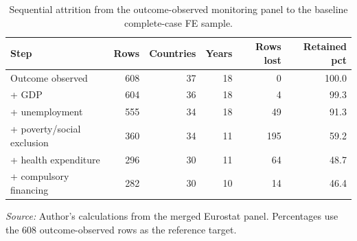 \begin{table}[H]
\centering
\small
\caption{Sequential attrition from the outcome-observed monitoring panel to the baseline complete-case FE sample.}
\label{tab:complete_case_attrition_waterfall}
\begin{tabular}{@{}lrrrrr@{}}
\toprule
Step & Rows & Countries & Years & Rows lost & Retained pct \\
\midrule
Outcome observed & 608 & 37 & 18 & 0 & 100.0 \\
+ GDP & 604 & 36 & 18 & 4 & 99.3 \\
+ unemployment & 555 & 34 & 18 & 49 & 91.3 \\
+ poverty/social exclusion & 360 & 34 & 11 & 195 & 59.2 \\
+ health expenditure & 296 & 30 & 11 & 64 & 48.7 \\
+ compulsory financing & 282 & 30 & 10 & 14 & 46.4 \\
\bottomrule
\end{tabular}

\vspace{0.2em}
\begin{minipage}{0.92\textwidth}\scriptsize \textit{Source:} Author's calculations from the merged Eurostat panel. Percentages use the 608 outcome-observed rows as the reference target.\end{minipage}
\end{table}

